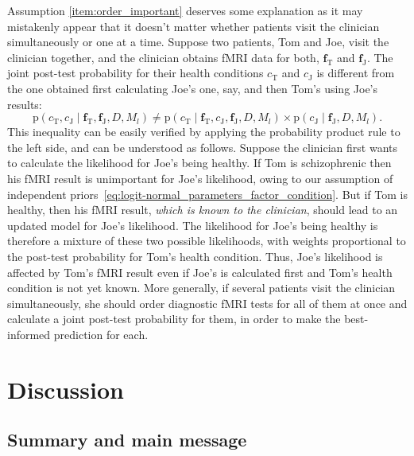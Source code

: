 \documentclass[%
]{frontiersSCNS-nologo} %
\newcommand*{\pf}{\mathrm{p}}%
\renewcommand*{\|}{\mathpunct{|}}%
\newcommand*{\yh}{c}
\newcommand*{\yD}{D}
\newcommand*{\yxx}{f}
\newcommand*{\yx}{\bm{\yxx}}
\newcommand*{\yM}{M}
\newcommand*{\yMl}{\yM_l}
\newcommand*{\tom}{\text{T}}
\newcommand*{\joe}{\text{J}}
\begin{document}
Assumption \ref{item:order_important} deserves some explanation as it may
mistakenly appear that it doesn't matter whether patients visit the
clinician simultaneously or one at a time. Suppose two patients, Tom and
Joe, visit the clinician together, and the clinician obtains fMRI data for
both, $\yx_{\tom}$ and $\yx_{\joe}$. The joint post-test probability for
their health conditions $\yh_{\tom}$ and $\yh_{\joe}$ is different from the
one obtained first calculating Joe's one, say, and then Tom's using Joe's results:
\begin{equation}
  \label{eq:tom_joe_relevance}
  \pf(\yh_{\tom},\yh_{\joe} \| \yx_{\tom}, \yx_{\joe}, \yD, \yMl) \ne
  \pf(\yh_{\tom} \| \yx_{\tom}, \yh_{\joe},\yx_{\joe}, \yD, \yMl) \times
  \pf(\yh_{\joe} \|\yx_{\joe}, \yD, \yMl).
\end{equation}
This inequality can be easily verified by applying the probability product
rule to the left side, and can be understood as follows. Suppose the
clinician first wants to calculate the likelihood for Joe's being healthy.
If Tom is schizophrenic then his fMRI result is unimportant for Joe's
likelihood, owing to our assumption of independent
priors~\eqref{eq:logit-normal_parameters_factor_condition}. But if Tom is
healthy, then his fMRI result, \emph{which is known to the clinician},
should lead to an updated model for Joe's likelihood. The likelihood for
Joe's being healthy is therefore a mixture of these two possible
likelihoods, with weights proportional to the post-test probability for
Tom's health condition. Thus, Joe's likelihood is affected by Tom's fMRI
result even if Joe's is calculated first and Tom's health condition is not
yet known. More generally, if several patients visit the clinician
simultaneously, she should order diagnostic fMRI tests for all of them at
once and calculate a joint post-test probability for them, in order to make
the best-informed prediction for each.




\section{Discussion}
\label{sec:discussion}

\subsection{Summary and main message}
\label{sec:summary}
\end{document}
